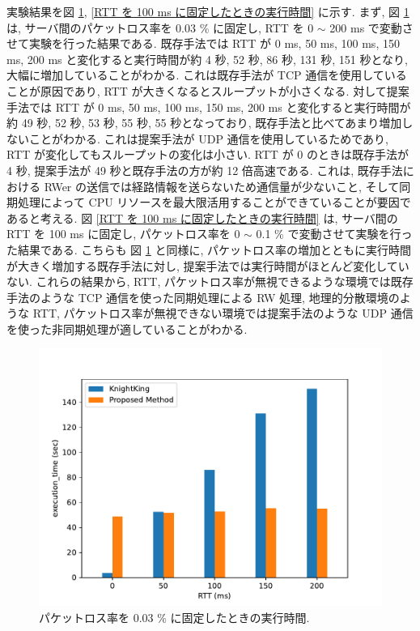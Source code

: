 実験結果を図 \ref{パケットロス率を 0.03 に固定したときの実行時間}, \ref{RTT を 100 ms に固定したときの実行時間} に示す. まず, 図 \ref{パケットロス率を 0.03 に固定したときの実行時間} は, サーバ間のパケットロス率を 0.03 \% に固定し, RTT を 0 $\sim$ 200 ms で変動させて実験を行った結果である. 既存手法では RTT が 0 ms, 50 ms, 100 ms, 150 ms, 200 ms と変化すると実行時間が約 4 秒, 52 秒, 86 秒, 131 秒, 151 秒となり, 大幅に増加していることがわかる. これは既存手法が TCP 通信を使用していることが原因であり, RTT が大きくなるとスループットが小さくなる. 対して提案手法では RTT が 0 ms, 50 ms, 100 ms, 150 ms, 200 ms と変化すると実行時間が約 49 秒, 52 秒, 53 秒, 55 秒, 55 秒となっており, 既存手法と比べてあまり増加しないことがわかる. これは提案手法が UDP 通信を使用しているためであり, RTT が変化してもスループットの変化は小さい. RTT が 0 のときは既存手法が 4 秒, 提案手法が 49 秒と既存手法の方が約 12 倍高速である. これは, 既存手法における RWer の送信では経路情報を送らないため通信量が少ないこと, そして同期処理によって CPU リソースを最大限活用することができていることが要因であると考える. 図 \ref{RTT を 100 ms に固定したときの実行時間} は, サーバ間の RTT を 100 ms に固定し, パケットロス率を 0 $\sim$ 0.1 \% で変動させて実験を行った結果である. こちらも 図 \ref{パケットロス率を 0.03 に固定したときの実行時間} と同様に, パケットロス率の増加とともに実行時間が大きく増加する既存手法に対し, 提案手法では実行時間がほとんど変化していない. これらの結果から, RTT, パケットロス率が無視できるような環境では既存手法のような TCP 通信を使った同期処理による RW 処理, 地理的分散環境のような RTT, パケットロス率が無視できない環境では提案手法のような UDP 通信を使った非同期処理が適していることがわかる. 

\begin{figure}[t]
    \centering
    \includegraphics[scale=0.8]{figure/Kn_vs_AR_RTT.pdf}
    \caption{パケットロス率を 0.03 \% に固定したときの実行時間.}
    \label{パケットロス率を 0.03 に固定したときの実行時間}
\end{figure}

